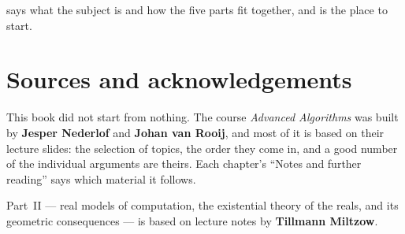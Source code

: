  says what the subject is and how the five parts fit
together, and is the place to start.

\section*{Sources and acknowledgements}

This book did not start from nothing. The course \emph{Advanced Algorithms} was
built by \textbf{Jesper Nederlof} and \textbf{Johan van Rooij}, and most of it
is based on their lecture slides: the selection of topics, the order they come
in, and a good number of the individual arguments are theirs. Each chapter's
``Notes and further reading'' says which material it follows.

Part~II --- real models of computation, the existential theory of the reals,
and its geometric consequences --- is based on lecture notes by
\textbf{Tillmann Miltzow}.
